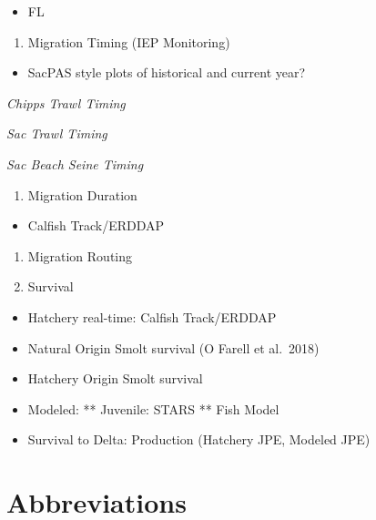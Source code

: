 \documentclass[
]{book}
\providecommand{\tightlist}{%
  \setlength{\itemsep}{0pt}\setlength{\parskip}{0pt}}
\theoremstyle{definition}
\theoremstyle{definition}
\theoremstyle{definition}
\theoremstyle{definition}
\theoremstyle{remark}
\begin{document}
\begin{itemize}
\tightlist
\item
  FL
\end{itemize}

\begin{enumerate}
\def\labelenumi{\arabic{enumi}.}
\setcounter{enumi}{2}
\tightlist
\item
  Migration Timing (IEP Monitoring)
\end{enumerate}

\begin{itemize}
\tightlist
\item
  SacPAS style plots of historical and current year?
\end{itemize}

\emph{Chipps Trawl Timing}

\emph{Sac Trawl Timing}

\emph{Sac Beach Seine Timing}

\begin{enumerate}
\def\labelenumi{\arabic{enumi}.}
\setcounter{enumi}{3}
\tightlist
\item
  Migration Duration
\end{enumerate}

\begin{itemize}
\tightlist
\item
  Calfish Track/ERDDAP
\end{itemize}

\begin{enumerate}
\def\labelenumi{\arabic{enumi}.}
\setcounter{enumi}{4}
\item
  Migration Routing
\item
  Survival
\end{enumerate}

\begin{itemize}
\tightlist
\item
  Hatchery real-time: Calfish Track/ERDDAP
\item
  Natural Origin Smolt survival (O Farell et al.~2018)
\item
  Hatchery Origin Smolt survival
\item
  Modeled: ** Juvenile: STARS ** Fish Model
\item
  Survival to Delta: Production (Hatchery JPE, Modeled JPE)
\end{itemize}

\hypertarget{abbreviations}{%
\chapter{Abbreviations}\label{abbreviations}}
\end{document}
